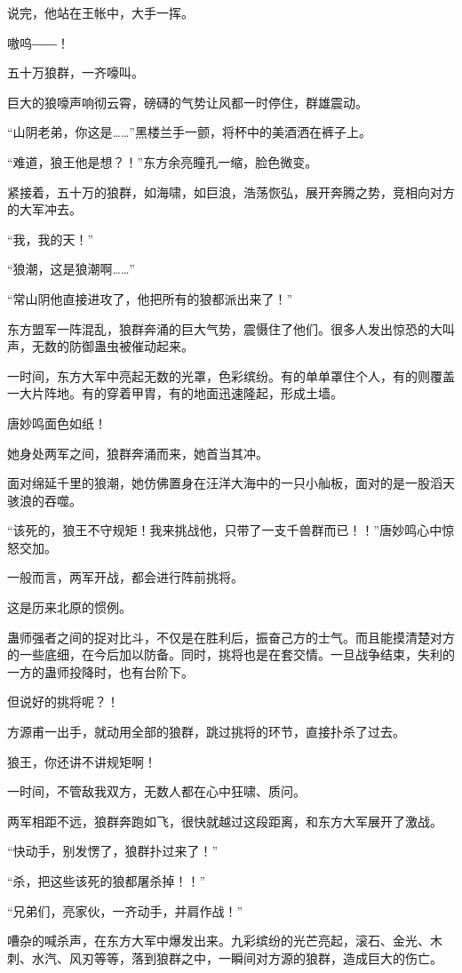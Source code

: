 \begin{this_body}
说完，他站在王帐中，大手一挥。

嗷呜――！

五十万狼群，一齐嚎叫。

巨大的狼嚎声响彻云霄，磅礴的气势让风都一时停住，群雄震动。

“山阴老弟，你这是……”黑楼兰手一颤，将杯中的美酒洒在裤子上。

“难道，狼王他是想？！”东方余亮瞳孔一缩，脸色微变。

紧接着，五十万的狼群，如海啸，如巨浪，浩荡恢弘，展开奔腾之势，竞相向对方的大军冲去。

“我，我的天！”

“狼潮，这是狼潮啊……”

“常山阴他直接进攻了，他把所有的狼都派出来了！”

东方盟军一阵混乱，狼群奔涌的巨大气势，震慑住了他们。很多人发出惊恐的大叫声，无数的防御蛊虫被催动起来。

一时间，东方大军中亮起无数的光罩，色彩缤纷。有的单单罩住个人，有的则覆盖一大片阵地。有的穿着甲胄，有的地面迅速隆起，形成土墙。

唐妙鸣面色如纸！

她身处两军之间，狼群奔涌而来，她首当其冲。

面对绵延千里的狼潮，她仿佛置身在汪洋大海中的一只小舢板，面对的是一股滔天骇浪的吞噬。

“该死的，狼王不守规矩！我来挑战他，只带了一支千兽群而已！！”唐妙鸣心中惊怒交加。

一般而言，两军开战，都会进行阵前挑将。

这是历来北原的惯例。

蛊师强者之间的捉对比斗，不仅是在胜利后，振奋己方的士气。而且能摸清楚对方的一些底细，在今后加以防备。同时，挑将也是在套交情。一旦战争结束，失利的一方的蛊师投降时，也有台阶下。

但说好的挑将呢？！

方源甫一出手，就动用全部的狼群，跳过挑将的环节，直接扑杀了过去。

狼王，你还讲不讲规矩啊！

一时间，不管敌我双方，无数人都在心中狂啸、质问。

两军相距不远，狼群奔跑如飞，很快就越过这段距离，和东方大军展开了激战。

“快动手，别发愣了，狼群扑过来了！”

“杀，把这些该死的狼都屠杀掉！！”

“兄弟们，亮家伙，一齐动手，并肩作战！”

嘈杂的喊杀声，在东方大军中爆发出来。九彩缤纷的光芒亮起，滚石、金光、木刺、水汽、风刃等等，落到狼群之中，一瞬间对方源的狼群，造成巨大的伤亡。


\end{this_body}
